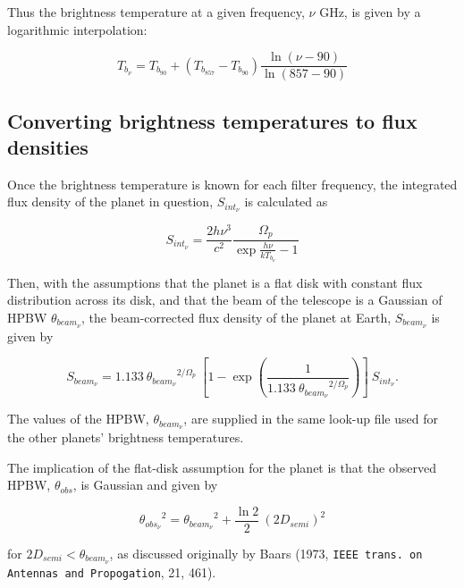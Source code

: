 \documentclass[11pt,twoside]{article}
\newcommand{\xlabel}[1]{}
\renewcommand{\_}{\texttt{\symbol{95}}}
\begin{document}
Thus the brightness temperature at a given frequency, $\nu$ GHz, is given by a logarithmic interpolation:

\begin{displaymath}
T_{b_\nu} = T_{b_{90}} + (T_{b_{857}} - T_{b_{90}})\frac{\ln(\nu - 90)}{\ln(857 -90)}
\end{displaymath}

\subsection{Converting brightness temperatures to flux densities}
\xlabel{fluxdensities}
\label{sec:fluxdensities}

Once the brightness temperature is known for each filter frequency, the integrated flux density of the planet in question, $S_{int_\nu}$ is calculated as

\begin{displaymath}
S_{int_\nu} = \frac{2 h \nu^3}{c^2}\frac{ \Omega_p}{\exp{\frac{h \nu}{k T_{b_\nu}}} - 1}
\end{displaymath}

Then, with the assumptions that the planet is a flat disk with constant flux distribution across its disk, and that the beam of the telescope is a Gaussian of HPBW $\theta_{beam_\nu}$, the beam-corrected flux density of the planet at Earth, $S_{beam_\nu}$ is given by

\begin{displaymath}
S_{beam_\nu} = 1.133\ {\theta_{beam_\nu}}^{2/\Omega_p}\ [1 - \exp({\frac{1}{1.133\ {\theta_{beam_\nu}}^{2/\Omega_p} }})]\ S_{int_\nu}.
\end{displaymath}

The values of the HPBW, $\theta_{beam_\nu}$, are supplied in the same look-up file used for the other planets' brightness temperatures.

The implication of the flat-disk assumption for the planet is that the observed HPBW, $\theta_{obs}$, is Gaussian and given by

\begin{displaymath}
{\theta_{obs_\nu}}^2 = {\theta_{beam_\nu}}^2 + \frac{\ln 2}{2}\ {(2 D_{semi})}^2
\end{displaymath}

for $2 D_{semi} < \theta_{beam_\nu}$, as discussed originally by Baars (1973, {\tt{IEEE trans.\ on Antennas and Propogation}}, 21, 461).
\end{document}
